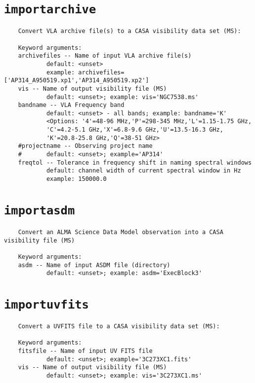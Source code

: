 \section{{\tt importarchive}}
\label{section:tasks.importarchive}

\small
\begin{verbatim}
    Convert VLA archive file(s) to a CASA visibility data set (MS):
    
    Keyword arguments:
    archivefiles -- Name of input VLA archive file(s)
            default: <unset>
            example: archivefiles=['AP314_A950519.xp1','AP314_A950519.xp2']
    vis -- Name of output visibility file (MS)
            default: <unset>; example: vis='NGC7538.ms'
    bandname -- VLA Frequency band
            default: <unset> - all bands; example: bandname='K'
            <Options: '4'=48-96 MHz,'P'=298-345 MHz,'L'=1.15-1.75 GHz,
            'C'=4.2-5.1 GHz,'X'=6.8-9.6 GHz,'U'=13.5-16.3 GHz,
            'K'=20.8-25.8 GHz,'Q'=38-51 GHz>
    #projectname -- Observing project name
    #       default: <unset>; example='AP314'
    freqtol -- Tolerance in frequency shift in naming spectral windows
            default: channel width of current spectral window in Hz
            example: 150000.0

\end{verbatim}
\normalsize


\section{{\tt importasdm}}
\label{section:tasks.importasdm}

\small
\begin{verbatim}
    Convert an ALMA Science Data Model observation into a CASA visibility file (MS)
    
    Keyword arguments:
    asdm -- Name of input ASDM file (directory)
            default: <unset>; example: asdm='ExecBlock3'
\end{verbatim}
\normalsize


\section{{\tt importuvfits}}
\label{section:tasks.importuvfits}

\small
\begin{verbatim}
    Convert a UVFITS file to a CASA visibility data set (MS):
    
    Keyword arguments:
    fitsfile -- Name of input UV FITS file
            default: <unset>; example='3C273XC1.fits'
    vis -- Name of output visibility file (MS)
            default: <unset>; example: vis='3C273XC1.ms'
\end{verbatim}
\normalsize


